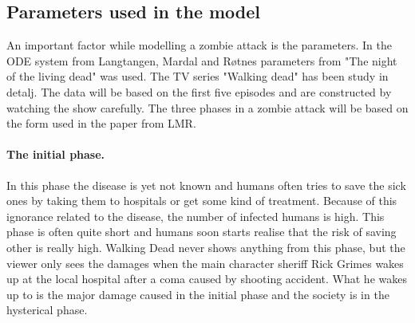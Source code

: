 \documentclass[%
twoside,                 %
final,                   %
10pt]{article}
\begin{document}
\subsection{Parameters used in the model}
An important factor while modelling a zombie attack is the parameters. In the ODE system from Langtangen, Mardal and Røtnes parameters from "The night of the living dead" was used. The TV series "Walking dead" has been study in detalj. The data will be based on the first five episodes and are constructed by watching the show carefully. The three phases in a zombie attack will be based on the form used in the paper from LMR.

\paragraph{The initial phase.}
In this phase the disease is yet not known and humans often tries to save the sick ones by taking them to hospitals or get some kind of treatment. Because of this ignorance related to the disease, the number of infected humans is high. This phase is often quite short and humans soon starts realise that the risk of saving other is really high. Walking Dead never shows anything from this phase, but the viewer only sees the damages when the main character sheriff Rick Grimes wakes up at the local hospital after a coma caused by shooting accident. What he wakes up to is the major damage caused in the initial phase and the society is in the hysterical phase.
\\
\\
\end{document}
